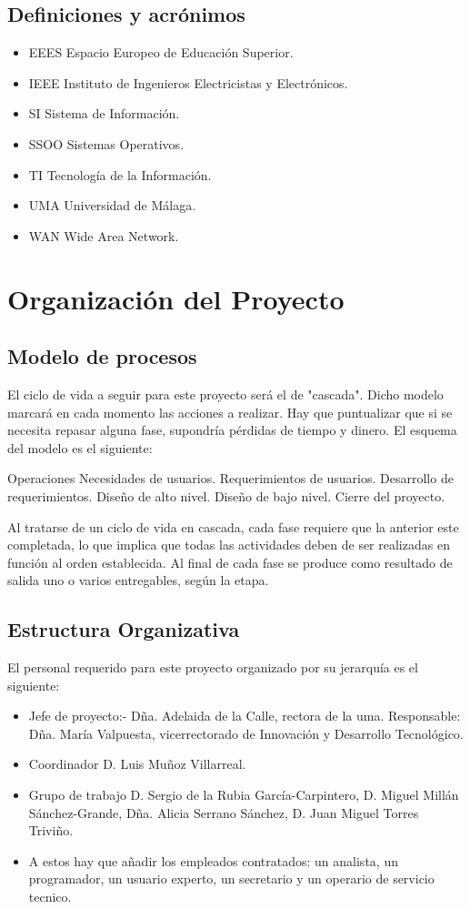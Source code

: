 \documentclass[11pt,a4paper,spanish,twoside]{report}
\begin{document}
\section{Definiciones y acrónimos}
\begin{itemize}
\item{EEES} Espacio Europeo de Educación Superior.
\item{IEEE} Instituto de Ingenieros Electricistas y Electrónicos.
\item{SI} Sistema de Información.
\item{SSOO} Sistemas Operativos.
\item{TI} Tecnología de la Información.
\item{UMA} Universidad de Málaga.
\item{WAN} Wide Area Network.
\end{itemize}

\chapter{Organización del Proyecto}
\section{Modelo de procesos}
El ciclo de vida a seguir para este proyecto será el de "cascada". Dicho 
modelo marcará en cada momento las acciones a realizar. Hay que puntualizar 
que si se necesita repasar alguna fase, supondría pérdidas de tiempo y dinero.
El esquema del modelo es el siguiente:

Operaciones
	Necesidades de usuarios.
		Requerimientos de usuarios.
			Desarrollo de requerimientos.
				Diseño de alto nivel.
					Diseño de bajo nivel.
						Cierre del proyecto.

Al tratarse de un ciclo de vida en cascada, cada fase requiere que la anterior 
este completada, lo que implica que todas las actividades deben de ser 
realizadas en función al orden establecida. Al final de cada fase se produce 
como resultado de salida uno o varios entregables, según la etapa.
\section{Estructura Organizativa}
El personal requerido para este proyecto organizado por su jerarquía es el 
siguiente:
\begin{itemize}
\item Jefe de proyecto:- Dña. Adelaida de la Calle, rectora de la uma.
Responsable: Dña. María Valpuesta, vicerrectorado de Innovación y Desarrollo Tecnológico.
\item Coordinador D. Luis Muñoz Villarreal.
\item Grupo de trabajo D. Sergio de la Rubia García-Carpintero, D. Miguel Millán 
Sánchez-Grande, Dña. Alicia Serrano Sánchez, D. Juan Miguel Torres Triviño. 
\item A estos hay que añadir los empleados contratados: un analista, un programador,
un usuario experto, un secretario y un operario de servicio tecnico.
\end{itemize}
\end{document}
